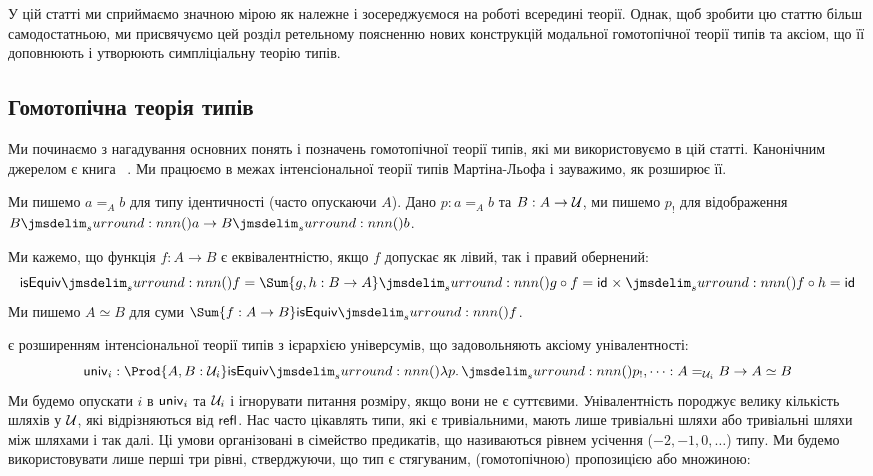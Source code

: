 \documentclass[12pt]{article}
\newcommand{\parencite}{\cite}
\newcommand{\Equiv}{\mathrel{\simeq}}
\let\prn\DelimPrn
\begin{document}
У цій статті ми сприймаємо \STT{} значною мірою як належне і зосереджуємося на роботі всередині теорії. Однак, щоб зробити цю статтю більш самодостатньою, ми присвячуємо цей розділ ретельному поясненню нових конструкцій модальної гомотопічної теорії типів та аксіом, що її доповнюють і утворюють симпліціальну теорію типів.

\subsection{Гомотопічна теорія типів}
Ми починаємо з нагадування основних понять і позначень гомотопічної теорії типів, які ми використовуємо в цій статті. Канонічним джерелом є книга \HoTT{}~\parencite{hottbook}. Ми працюємо в межах інтенсіональної теорії типів Мартіна-Льофа і зауважимо, як \HoTT{} розширює її.

\begin{nota}
  Ми пишемо $a =_A b$ для типу ідентичності (часто опускаючи $A$). Дано $p : a =_A b$ та
  $B : A \to \Uni$, ми пишемо $p_!$ для відображення $B\prn{a} \to B\prn{b}$.
\end{nota}

\begin{defi}
  Ми кажемо, що функція $f : A \to B$ є еквівалентністю, якщо $f$ допускає як лівий, так і правий
  обернений:
  \[
    \IsEquiv\prn{f} =
    \Sum{g,h : B \to A} \prn{g \circ f = \ArrId{}} \times \prn{f \circ h = \ArrId{}}
  \]
  Ми пишемо $A \Equiv B$ для суми $\Sum{f : A \to B} \IsEquiv\prn{f}$.
\end{defi}
\HoTT{} є розширенням інтенсіональної теорії типів з ієрархією універсумів, що задовольняють аксіому унівалентності:
\[
  \Con{univ}_i
  :
  \Prod{A, B : \Uni[i]} \IsEquiv\prn{
    \lambda p.\,\prn{p_!, \cdots} : A =_{\Uni[i]} B \to A \Equiv B
  }
\]
Ми будемо опускати $i$ в $\mathsf{univ}_i$ та $\Uni[i]$ і ігнорувати питання розміру, якщо вони не є суттєвими. Унівалентність породжує велику кількість шляхів у $\Uni$, які відрізняються від ${\mathsf{refl}}$. Нас часто цікавлять типи, які є тривіальними, мають лише тривіальні шляхи або тривіальні шляхи між шляхами і так далі. Ці умови організовані в сімейство предикатів, що називаються рівнем усічення ($-2,-1,0,\ldots$) типу. Ми будемо використовувати лише перші три рівні, стверджуючи, що тип є стягуваним, (гомотопічною) пропозицією або множиною:
\end{document}
